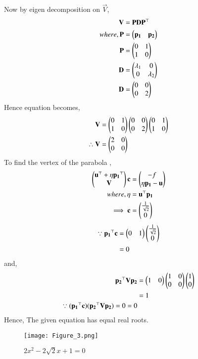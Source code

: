 \documentclass[journal,12pt,twocolumn]{IEEEtran}
\begin{document}
Now by eigen decomposition on $\vec{V}$,
\begin{align}
    \mathbf{V}&= \mathbf{P}\mathbf{D}\mathbf{P}^{\top}\\
    where,\mathbf{P}&= \begin{pmatrix}\mathbf{p_{1}}&\mathbf{p_{2}}\end{pmatrix}\\
    \mathbf{P}&=\begin{pmatrix} 0 & 1 \\ 1 & 0\end{pmatrix}\\
    \mathbf{D}&= \begin{pmatrix}\lambda_{1} & 0 \\ 0 & \lambda_{2}\end{pmatrix}\\
    \mathbf{D}&= \begin{pmatrix}0 & 0 \\ 0 & 2\end{pmatrix}
\end{align}
Hence equation becomes,
\begin{align}
    \mathbf{V}&= \begin{pmatrix} 0 & 1 \\ 1 & 0\end{pmatrix}\begin{pmatrix}0 & 0 \\ 0 & 2\end{pmatrix}\begin{pmatrix} 0 & 1 \\ 1 & 0\end{pmatrix}\\
    \therefore \mathbf{V}&=\begin{pmatrix}2 & 0 \\ 0 & 0\end{pmatrix}
\end{align}
To find the vertex of the parabola ,
\begin{align}
    \begin{pmatrix}\mathbf{u}^{\top}+ \eta \mathbf{p_1}^{\top} \\ \mathbf{V}\end{pmatrix}\mathbf{c} &= \begin{pmatrix}-f \\ \eta \mathbf{p_1}-\mathbf{u}\end{pmatrix}\\
    where, \eta &= \mathbf{u}^{\top}\mathbf{p_1}\\
    \implies
    \mathbf{c}&=\begin{pmatrix}\frac{1}{\sqrt{2}}\\0\end{pmatrix}
\end{align}
\begin{align}
    \because \mathbf{p_1}^{\top}\mathbf{c} &= \begin{pmatrix}0 & 1\end{pmatrix}\begin{pmatrix}\frac{1}{\sqrt{2}}\\0\end{pmatrix} \\
    &= 0
\end{align}
and,
\begin{align}
    \mathbf{p_2}^{\top}\mathbf{V}\mathbf{p_2}&= \begin{pmatrix}1 & 0\end{pmatrix}\begin{pmatrix}1 & 0 \\ 0 & 0\end{pmatrix}\begin{pmatrix}1 \\ 0\end{pmatrix}\\
    &= 1\\
    \because (\mathbf{p_1}^{\top}\mathbf{c}) (\mathbf{p_2}^{\top}\mathbf{V}\mathbf{p_2})=0=0 
\end{align}
Hence, The given equation has equal real roots.
\begin{figure}[htp]
    \centering
    \texttt{[image: Figure\_3.png]}
    \caption{$2x^2-2\sqrt{2}x+1=0$}
\end{figure}
\end{document}
